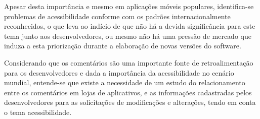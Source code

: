 Apesar desta importância e mesmo em aplicações móveis populares, identifica-se problemas de acessibilidade conforme com os padrões internacionalmente reconhecidos, o que leva ao indício de que não há a devida significância para este tema junto aos desenvolvedores, ou mesmo não há uma pressão de mercado que induza a esta priorização durante a elaboração de novas versões do software.

Considerando que os comentários são uma importante fonte de retroalimentação para os desenvolvedores e dada a importância da acessibilidade no cenário mundial, entende-se que existe a necessidade de um estudo do relacionamento entre os comentários em lojas de aplicativos, e as informações cadastradas pelos desenvolvedores para as solicitações de modificações e alterações, tendo em conta o tema acessibilidade.
